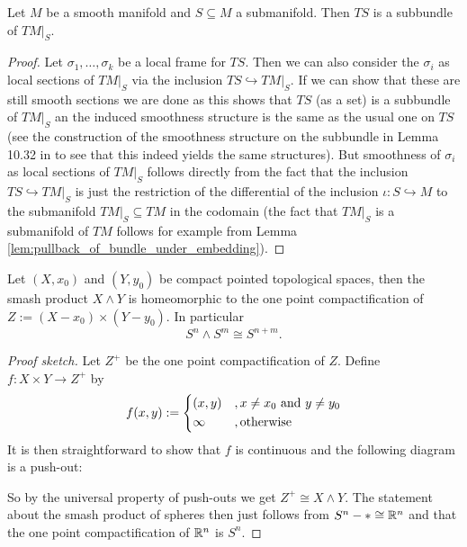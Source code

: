 \begin{exercise}
    Let $M$ be a smooth manifold and $S \subseteq M$ a submanifold. Then $TS$ is a subbundle of $TM|_S$.
\end{exercise}
\begin{proof}
    Let $\sigma_1,\ldots,\sigma_k$ be a local frame for $TS$. Then we can also consider the $\sigma_i$ as local sections of $TM|_S$ via the inclusion $TS \hookrightarrow TM|_S$. If we can show that these are still smooth sections we are done as this shows that $TS$ (as a set) is a subbundle of $TM|_S$ an the induced smoothness structure is the same as the usual one on $TS$ (see the construction of the smoothness structure on the subbundle in Lemma 10.32 in \cite{lee2011smooth} to see that this indeed yields the same structures). But smoothness of $\sigma_i$ as local sections of $TM|_S$ follows directly from the fact that the inclusion $TS \hookrightarrow TM|_S$ is just the restriction of the differential of the inclusion $\iota \colon S \hookrightarrow M$ to the submanifold $TM|_S \subseteq TM$ in the codomain (the fact that $TM|_S$ is a submanifold of $TM$ follows for example from Lemma \ref{lem:pullback_of_bundle_under_embedding}).
\end{proof}

\begin{exercise}
    Let $(X,x_0)$ and $(Y,y_0)$ be compact pointed topological spaces, then the smash product $X \wedge Y$ is homeomorphic to the one point compactification of $Z := (X-x_0) \times (Y-y_0)$. In particular
    \[
    S^n \wedge S^m \cong S^{n+m}.
    \]
\end{exercise}
\begin{proof}[Proof sketch]
    Let $Z^+$ be the one point compactification of $Z$. Define $f \colon X \times Y \to Z^+$ by
    \[
    f(x,y) := \begin{dcases}
        (x,y) &, x \neq x_0 \text{ and } y \neq y_0 \\
        \infty &, \mathrm{otherwise}
    \end{dcases}
    \]
    It is then straightforward to show that $f$ is continuous and the following diagram is a push-out:
    \begin{center}
    \end{center} 
    So by the universal property of push-outs we get $Z^+ \cong X \wedge Y$. The statement about the smash product of spheres then just follows from $S^n - \ast \cong \mathbb{R}^n$ and that the one point compactification of $\mathbb{R}^n$ is $S^n$.
\end{proof}